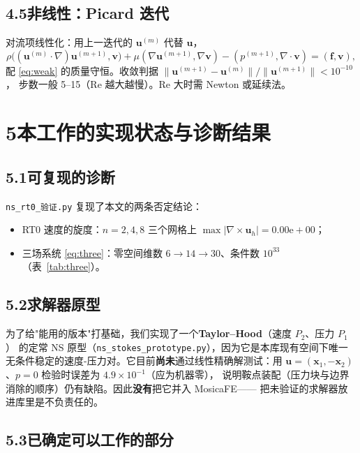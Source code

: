 \documentclass[UTF8,11pt,a4paper]{ctexart}
\theoremstyle{wjplain}
\theoremstyle{wjdef}
\newcommand{\bu}{\boldsymbol u}
\newcommand{\bv}{\boldsymbol v}
\newcommand{\bx}{\boldsymbol x}
\newcommand{\grad}{\nabla}
\newcommand{\dive}{\nabla\cdot}
\newcommand{\curl}{\nabla\times}
\begin{document}
\subsection*{4.5\quad 非线性：Picard 迭代}

对流项线性化：用上一迭代的 $\bu^{(m)}$ 代替 $\bu$，
\begin{equation}\tag{4.9}
  \rho\bigl((\bu^{(m)}\cdot\grad)\bu^{(m+1)},\bv\bigr)
  +\mu(\grad\bu^{(m+1)},\grad\bv)-(p^{(m+1)},\dive\bv)=(\boldsymbol f,\bv),
\end{equation}
配 \eqref{eq:weak} 的质量守恒。收敛判据
$\lVert\bu^{(m+1)}-\bu^{(m)}\rVert/\lVert\bu^{(m+1)}\rVert<10^{-10}$，
步数一般 5--15（$\mathrm{Re}$ 越大越慢）。$\mathrm{Re}$ 大时需 Newton 或延续法。

\section{\texorpdfstring{5\quad 本工作的实现状态与诊断结果}{5 本工作的实现状态与诊断结果}}

\subsection*{5.1\quad 可复现的诊断}

\texttt{ns\_rt0\_验证.py} 复现了本文的两条否定结论：
\begin{itemize}
  \item RT0 速度的旋度：$n=2,4,8$ 三个网格上 $\max\lvert\curl\bu_h\rvert=0.00\mathrm{e}{+}00$；
  \item 三场系统 \eqref{eq:three}：零空间维数 $6\to14\to30$、条件数 $10^{33}$
        （表~\ref{tab:three}）。
\end{itemize}

\subsection*{5.2\quad 求解器原型}

为了给"能用的版本"打基础，我们实现了一个\textbf{Taylor--Hood}（速度 $P_2$、压力 $P_1$）
的定常 NS 原型（\texttt{ns\_stokes\_prototype.py}），因为它是本库现有空间下唯一
无条件稳定的速度-压力对。它目前\textbf{尚未}通过线性精确解测试：用
$\bu=(\bx_1,-\bx_2)$、$p=0$ 检验时误差为 $4.9\times10^{-1}$（应为机器零），
说明鞍点装配（压力块与边界消除的顺序）仍有缺陷。因此\textbf{没有}把它并入 MosicaFE——
把未验证的求解器放进库里是不负责任的。

\subsection*{5.3\quad 已确定可以工作的部分}
\end{document}
